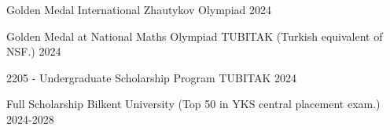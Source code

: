 
\begin{cvhonors}
 

  \cvhonor
    {Golden Medal} %
    {International Zhautykov Olympiad} %
    {}
    {2024} %

  \cvhonor
    {Golden Medal at National Maths Olympiad} %
    {TUBITAK (Turkish equivalent of NSF.) } %
    {} %
    {2024} %

  \cvhonor
    {2205 - Undergraduate Scholarship Program} %
    {TUBITAK} %
    {} %
    {2024} %

 \cvhonor
    {Full Scholarship} %
    {Bilkent University (Top 50 in YKS central placement exam.)} %
    {} %
    {2024-2028} %
\end{cvhonors}

